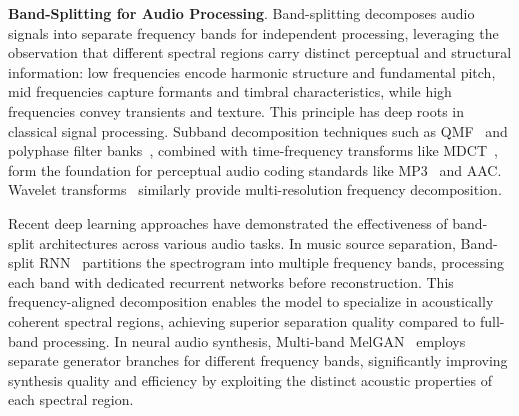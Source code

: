 \documentclass[11pt]{article}
\begin{document}
\noindent\textbf{Band-Splitting for Audio Processing}.
Band-splitting decomposes audio signals into separate frequency bands for independent processing, leveraging the observation that different spectral regions carry distinct perceptual and structural information: low frequencies encode harmonic structure and fundamental pitch, mid frequencies capture formants and timbral characteristics, while high frequencies convey transients and texture. This principle has deep roots in classical signal processing. Subband decomposition techniques such as QMF~\cite{malvar1990modulated} and polyphase filter banks~\cite{saramaki2002multirate}, combined with time-frequency transforms like 
MDCT~\cite{prokop2003general}, form the foundation for perceptual audio coding 
standards like MP3~\cite{brandenburg1999mp3} and AAC. Wavelet transforms~\cite{zhang2019wavelet} similarly provide multi-resolution frequency decomposition.


Recent deep learning approaches have demonstrated the effectiveness of band-split architectures across various audio tasks. In music source separation, Band-split RNN~\cite{luo2023music} partitions the spectrogram into multiple frequency bands, processing each band with dedicated recurrent networks before reconstruction. This frequency-aligned decomposition enables the model to specialize in acoustically coherent spectral regions, achieving superior separation quality compared to full-band processing. In neural audio synthesis, Multi-band MelGAN~\cite{yang2021multi} employs separate generator branches for different frequency bands, significantly improving synthesis quality and efficiency by exploiting the distinct acoustic properties of each spectral region.
\end{document}
